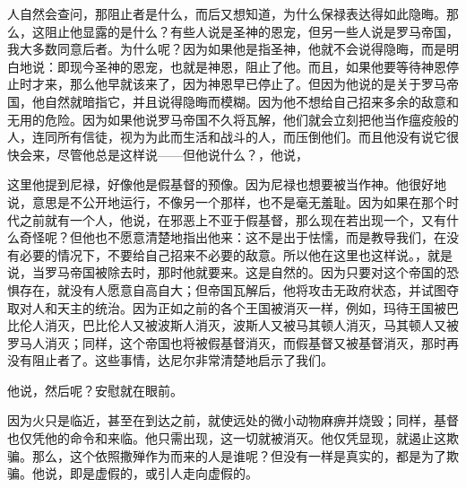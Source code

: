 \par

\par

人自然会查问，那阻止者是什么，而后又想知道，为什么保禄表达得如此隐晦。那么，这阻止他显露的是什么？有些人说是圣神的恩宠，但另一些人说是罗马帝国，我大多数同意后者。为什么呢？因为如果他是指圣神，他就不会说得隐晦，而是明白地说：即现今圣神的恩宠，也就是神恩，阻止了他。而且，如果他要等待神恩停止时才来，那么他早就该来了，因为神恩早已停止了。但因为他说的是关于罗马帝国，他自然就暗指它，并且说得隐晦而模糊。因为他不想给自己招来多余的敌意和无用的危险。因为如果他说罗马帝国不久将瓦解，他们就会立刻把他当作瘟疫般的人，连同所有信徒，视为为此而生活和战斗的人，而压倒他们。而且他没有说它很快会来，尽管他总是这样说——但他说什么？，他说，\par

这里他提到尼禄，好像他是假基督的预像。因为尼禄也想要被当作神。他很好地说，意思是不公开地运行，不像另一个那样，也不是毫无羞耻。因为如果在那个时代之前就有一个人，他说，在邪恶上不亚于假基督，那么现在若出现一个，又有什么奇怪呢？但他也不愿意清楚地指出他来：这不是出于怯懦，而是教导我们，在没有必要的情况下，不要给自己招来不必要的敌意。所以他在这里也这样说。，就是说，当罗马帝国被除去时，那时他就要来。这是自然的。因为只要对这个帝国的恐惧存在，就没有人愿意自高自大；但帝国瓦解后，他将攻击无政府状态，并试图夺取对人和天主的统治。因为正如之前的各个王国被消灭一样，例如，玛待王国被巴比伦人消灭，巴比伦人又被波斯人消灭，波斯人又被马其顿人消灭，马其顿人又被罗马人消灭；同样，这个帝国也将被假基督消灭，而假基督又被基督消灭，那时再没有阻止者了。这些事情，达尼尔非常清楚地启示了我们。\par

他说，然后呢？安慰就在眼前。\par

因为火只是临近，甚至在到达之前，就使远处的微小动物麻痹并烧毁；同样，基督也仅凭他的命令和来临。他只需出现，这一切就被消灭。他仅凭显现，就遏止这欺骗。那么，这个依照撒殚作为而来的人是谁呢？但没有一样是真实的，都是为了欺骗。他说，即是虚假的，或引人走向虚假的。\par

